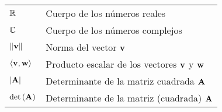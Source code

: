 \chapter*{\notationname}
\pagestyle{especial}
\chaptermark{\notationname}
{}
\begin{longtable}{p{3cm}p{8.5cm}}

$\mathbb{R}$ & Cuerpo de los números reales \\
$\mathbb{C}$ & Cuerpo de los números complejos\\
$\left\| \mathbf{v} \right\|$ & Norma del vector $\mathbf{v}$ \\
$\left\langle {\mathbf{v}, \mathbf{w}} \right\rangle$ & Producto escalar de los vectores $\mathbf{v}$ y $\mathbf{w}$\\
$\left| {\mathbf{A}} \right|$ &Determinante de la matriz cuadrada $\mathbf{A}$\\
$\textrm{det}\left( {\mathbf{A}} \right)$ &Determinante de la matriz (cuadrada) $\mathbf{A}$\\

\end{longtable}
